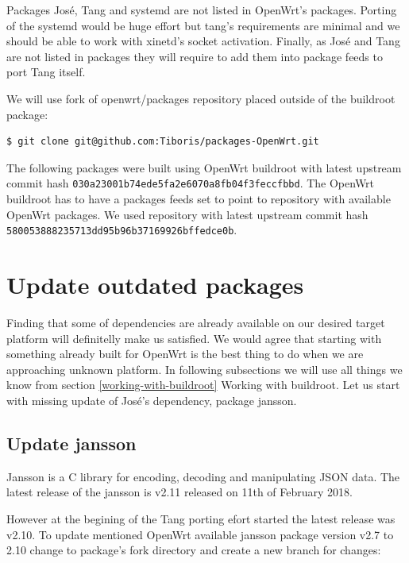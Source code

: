 Packages José, Tang and systemd are not listed in OpenWrt's packages.
Porting of the systemd would be huge effort but tang's requirements are minimal and we should be able to work with xinetd's socket activation.
Finally, as José and Tang are not listed in packages they will require to add them into package feeds to port Tang itself.

We will use fork of openwrt/packages repository placed outside of the buildroot package:
\begin{lstlisting}[columns=fixed,basicstyle=\ttfamily\footnotesize,tabsize=4,backgroundcolor=\color{yellow!10}]
$ git clone git@github.com:Tiboris/packages-OpenWrt.git
\end{lstlisting}

The following packages were built using OpenWrt buildroot with latest upstream commit hash {\tt 030a23001b74ede5fa2e6070a8fb04f3feccfbbd}.
The OpenWrt buildroot has to have a packages feeds set to point to repository with available OpenWrt packages.
We used repository with latest upstream commit hash {\tt 580053888235713dd95b96b37169926bffedce0b}.
\newpage


\section{Update outdated packages}

Finding that some of dependencies are already available on our desired target platform will definitelly make us satisfied.
We would agree that starting with something already built for OpenWrt is the best thing to do when we are approaching unknown platform.
In following subsections we will use all things we know from section \ref{working-with-buildroot} Working with buildroot.
Let us start with missing update of José's dependency, package jansson.



\subsection{Update jansson}\label{jansson}
Jansson is a C library for encoding, decoding and manipulating JSON data.
The latest release of the jansson is v2.11 released on 11th of February 2018\cite{jansson}.

However at the begining of the Tang porting efort started the latest release was v2.10.
To update mentioned OpenWrt available jansson package version v2.7 to 2.10 change to package's fork directory and create a new branch for changes:

